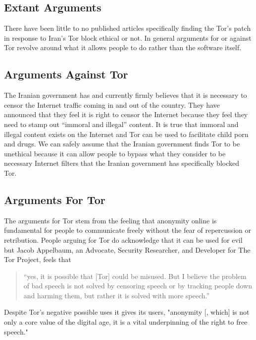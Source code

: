 \documentclass[11pt]{article}
\begin{document}
\begin{multicols}{2}
\section{Extant Arguments} 

There have been little to no published articles specifically finding the Tor's
patch in response to Iran's Tor block ethical or not. In general arguments for
or against Tor revolve around what it allows people to do rather than the
software itself.

\subsection{Arguments Against Tor}

The Iranian government has and currently firmly believes that it is necessary to
censor the Internet traffic coming in and out of the country. They have
announced that they feel it is right to censor the Internet because they feel
they need to stamp out ``immoral and illegal''
content.\cite{CensorshipFearsRise} It is true that immoral and illegal content
exists on the Internet and Tor can be used to facilitate child porn and
drugs.\cite{Tor:ChildPorn, Tor:SilkRoad} We can safely assume that the Iranian
government finds Tor to be unethical because it can allow people to bypass what
they consider to be necessary Internet filters that the Iranian government has
specifically blocked Tor.\cite{IranBlocksTorSameDayFix}

\subsection{Arguments For Tor}

The arguments for Tor stem from the feeling that anonymity online is fundamental
for people to communicate freely without the fear of repercussion or
retribution.\cite{Tor:ArgumentForAppelbaum} People arguing for Tor do
acknowledge that it can be used for evil but Jacob Appelbaum, an Advocate,
Security Researcher, and Developer for The Tor Project, feels that
\begin{quotation} 
  
  ``yes, it is possible that [Tor] could be misused. But I believe the problem
  of bad speech is not solved by censoring speech or by tracking people down and
  harming them, but rather it is solved with more
  speech.''\cite{Tor:ArgumentForAppelbaum}

\end{quotation}
Despite Tor's negative possible uses it gives its users, 
"anonymity [, which] is not only a core value of the digital age, it is a vital
underpinning of the right to free speech."\cite{TorCreatesSaferInternet}





\end{multicols}
\end{document}
